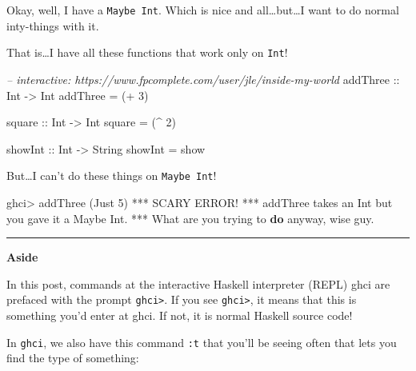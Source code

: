 \documentclass[]{article}
\newenvironment{Shaded}{}{}
\newcommand{\KeywordTok}[1]{\textcolor[rgb]{0.00,0.44,0.13}{\textbf{{#1}}}}
\newcommand{\DataTypeTok}[1]{\textcolor[rgb]{0.56,0.13,0.00}{{#1}}}
\newcommand{\DecValTok}[1]{\textcolor[rgb]{0.25,0.63,0.44}{{#1}}}
\newcommand{\CommentTok}[1]{\textcolor[rgb]{0.38,0.63,0.69}{\textit{{#1}}}}
\newcommand{\OtherTok}[1]{\textcolor[rgb]{0.00,0.44,0.13}{{#1}}}
\newcommand{\FunctionTok}[1]{\textcolor[rgb]{0.02,0.16,0.49}{{#1}}}
\newcommand{\NormalTok}[1]{{#1}}
\begin{document}
Okay, well, I have a \texttt{Maybe\ Int}. Which is nice and
all\ldots{}but\ldots{}I want to do normal inty-things with it.

That is\ldots{}I have all these functions that work only on
\texttt{Int}!

\begin{Shaded}
\begin{Highlighting}[]
\CommentTok{-- interactive: https://www.fpcomplete.com/user/jle/inside-my-world}
\OtherTok{addThree ::} \DataTypeTok{Int} \OtherTok{->} \DataTypeTok{Int}
\NormalTok{addThree }\FunctionTok{=} \NormalTok{(}\FunctionTok{+} \DecValTok{3}\NormalTok{)}

\OtherTok{square ::} \DataTypeTok{Int} \OtherTok{->} \DataTypeTok{Int}
\NormalTok{square }\FunctionTok{=} \NormalTok{(}\FunctionTok{^} \DecValTok{2}\NormalTok{)}

\NormalTok{showInt}\OtherTok{ ::} \DataTypeTok{Int} \OtherTok{->} \DataTypeTok{String}
\NormalTok{showInt }\FunctionTok{=} \NormalTok{show}
\end{Highlighting}
\end{Shaded}

But\ldots{}I can't do these things on \texttt{Maybe\ Int}!

\begin{Shaded}
\begin{Highlighting}[]
\NormalTok{ghci}\FunctionTok{>} \NormalTok{addThree (}\DataTypeTok{Just} \DecValTok{5}\NormalTok{)}
\FunctionTok{***} \DataTypeTok{SCARY} \DataTypeTok{ERROR}\FunctionTok{!}
\FunctionTok{***} \NormalTok{addThree takes an }\DataTypeTok{Int} \NormalTok{but you gave it a }\DataTypeTok{Maybe} \DataTypeTok{Int}\FunctionTok{.}
\FunctionTok{***} \DataTypeTok{What} \NormalTok{are you trying to }\KeywordTok{do} \NormalTok{anyway, wise guy}\FunctionTok{.}
\end{Highlighting}
\end{Shaded}

\begin{center}\rule{0.5\linewidth}{\linethickness}\end{center}

\textbf{Aside}

In this post, commands at the interactive Haskell interpreter (REPL)
ghci are prefaced with the prompt \texttt{ghci\textgreater{}}. If you
see \texttt{ghci\textgreater{}}, it means that this is something you'd
enter at ghci. If not, it is normal Haskell source code!

In \texttt{ghci}, we also have this command \texttt{:t} that you'll be
seeing often that lets you find the type of something:
\end{document}
